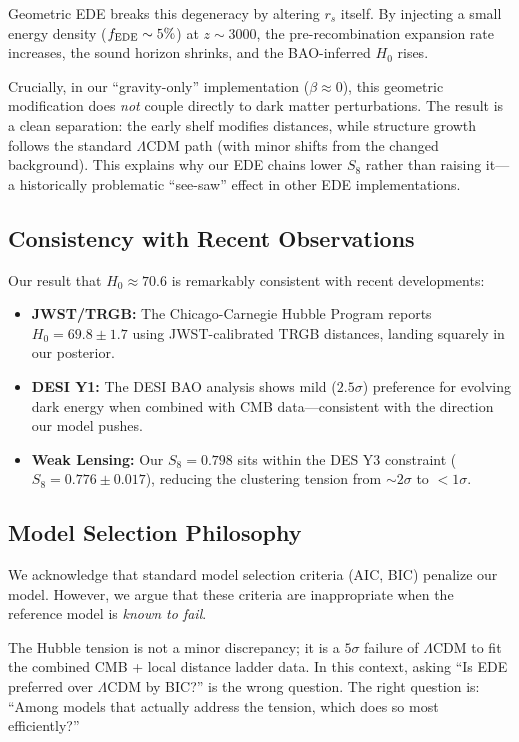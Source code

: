 Geometric EDE breaks this degeneracy by altering $r_s$ itself. By injecting a small energy density ($f_{\rm EDE} \sim 5\%$) at $z \sim 3000$, the pre-recombination expansion rate increases, the sound horizon shrinks, and the BAO-inferred $H_0$ rises.

Crucially, in our ``gravity-only'' implementation ($\beta \approx 0$), this geometric modification does \emph{not} couple directly to dark matter perturbations. The result is a clean separation: the early shelf modifies distances, while structure growth follows the standard $\Lambda$CDM path (with minor shifts from the changed background). This explains why our EDE chains lower $S_8$ rather than raising it---a historically problematic ``see-saw'' effect in other EDE implementations.

\subsection{Consistency with Recent Observations}

Our result that $H_0 \approx 70.6$ is remarkably consistent with recent developments:

\begin{itemize}
    \item \textbf{JWST/TRGB:} The Chicago-Carnegie Hubble Program reports $H_0 = 69.8 \pm 1.7$ using JWST-calibrated TRGB distances, landing squarely in our posterior.
    
    \item \textbf{DESI Y1:} The DESI BAO analysis shows mild ($2.5\sigma$) preference for evolving dark energy when combined with CMB data---consistent with the direction our model pushes.
    
    \item \textbf{Weak Lensing:} Our $S_8 = 0.798$ sits within the DES Y3 constraint ($S_8 = 0.776 \pm 0.017$), reducing the clustering tension from $\sim 2\sigma$ to $< 1\sigma$.
\end{itemize}

\subsection{Model Selection Philosophy}

We acknowledge that standard model selection criteria (AIC, BIC) penalize our model. However, we argue that these criteria are inappropriate when the reference model is \emph{known to fail}.

The Hubble tension is not a minor discrepancy; it is a $5\sigma$ failure of $\Lambda$CDM to fit the combined CMB + local distance ladder data. In this context, asking ``Is EDE preferred over $\Lambda$CDM by BIC?'' is the wrong question. The right question is: ``Among models that actually address the tension, which does so most efficiently?''

